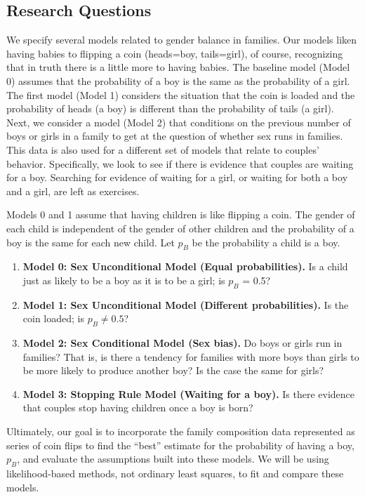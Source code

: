 \documentclass[
]{krantz}
\providecommand{\tightlist}{%
  \setlength{\itemsep}{0pt}\setlength{\parskip}{0pt}}
\begin{document}
\hypertarget{research-questions}{%
\subsection{Research Questions}\label{research-questions}}

We specify several models related to gender balance in families. Our models liken having babies to flipping a coin (heads=boy, tails=girl), of course, recognizing that in truth there is a little more to having babies. The baseline model (Model 0) assumes that the probability of a boy is the same as the probability of a girl. The first model (Model 1) considers the situation that the coin is loaded and the probability of heads (a boy) is different than the probability of tails (a girl). Next, we consider a model (Model 2) that conditions on the previous number of boys or girls in a family to get at the question of whether sex runs in families. This data is also used for a different set of models that relate to couples' behavior. Specifically, we look to see if there is evidence that couples are waiting for a boy. Searching for evidence of waiting for a girl, or waiting for both a boy and a girl, are left as exercises.

Models 0 and 1 assume that having children is like flipping a coin. The gender of each child is independent of the gender of other children and the probability of a boy is the same for each new child. Let \(p_B\) be the probability a child is a boy.

\begin{enumerate}
\def\labelenumi{\arabic{enumi}.}
\tightlist
\item
  \textbf{Model 0: Sex Unconditional Model (Equal probabilities).} Is a child just as likely to be a boy as it is to be a girl; is \(p_B\) = 0.5?
\item
  \textbf{Model 1: Sex Unconditional Model (Different probabilities).} Is the coin loaded; is \(p_B \neq 0.5\)?
\item
  \textbf{Model 2: Sex Conditional Model (Sex bias).} Do boys or girls run in families? That is,
  is there a tendency for families with more boys than girls to be more likely to produce another boy? Is the case the same for girls?
\item
  \textbf{Model 3: Stopping Rule Model (Waiting for a boy).}
  Is there evidence that couples stop having children once a boy is born?
\end{enumerate}

Ultimately, our goal is to incorporate the family composition data represented as series of coin flips to find the ``best'' estimate for the probability of having a boy, \(p_B\), and evaluate the assumptions built into these models. We will be using likelihood-based methods, not ordinary least squares, to fit and compare these models.
\end{document}
